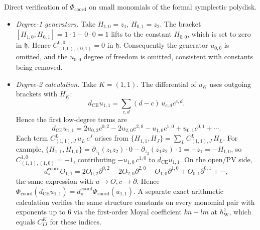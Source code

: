 \documentclass[11pt]{memoir}
\begin{document}
\begin{ex}\label{ex:low-degree-phi}
  Direct verification of \(\Phi_{\mathrm{coord}}\) on small monomials of
  the formal symplectic polydisk.

  \begin{itemize}
    \item \emph{Degree-1 generators.} Take $H_{1,0}=z_1$,
      $H_{0,1}=z_2$. The bracket
      $[H_{1,0},H_{0,1}]=1\cdot 1-0\cdot 0=1$ lifts to the constant
      $H_{0,0}$, which is set to zero in $\mathfrak h$. Hence
      $C^{0,0}_{(1,0),(0,1)}=0$ in $\mathfrak h$. Consequently
      the generator \(u_{0,0}\) is omitted, and the
      $u_{0,0}$ degree of freedom is omitted, consistent with
      constants being removed.

    \item \emph{Degree-2 calculation.} Take \(K=(1,1)\).  The
      differential of \(u_K\) uses outgoing brackets with \(H_K\):
      \[
        d_{\mathrm{CE}}u_{1,1}
        =\sum_{c,d}(d-c)\,u_{c,d}c^{c,d}.
      \]
      Hence the first low-degree terms are
      \[
        d_{\mathrm{CE}}u_{1,1}
        =
        2u_{0,2}c^{0,2}-2u_{2,0}c^{2,0}
        -u_{1,0}c^{1,0}+u_{0,1}c^{0,1}+\cdots .
      \]
      Each term
      \(C^L_{(1,1),J}\,u_L\,c^J\) arises from
      $\{H_{1,1},H_J\}=\sum_L C^L_{(1,1),J}\,H_L$. For example,
      $\{H_{1,1},H_{1,0}\}=\partial_{z_1}(z_1z_2)\cdot 0-
      \partial_{z_2}(z_1z_2)\cdot 1=-z_1=-H_{1,0}$, so
      $C^{1,0}_{(1,1),(1,0)}=-1$, contributing $-u_{1,0}\,c^{1,0}$ to
      $d_{\mathrm{CE}}u_{1,1}$. On the open/PV side,
      \[
        d_\pi^{\mathrm{coord}} O_{1,1}
        =
        2O_{0,2}\partial^{0,2}-2O_{2,0}\partial^{2,0}
        -O_{1,0}\partial^{1,0}+O_{0,1}\partial^{0,1}+\cdots ,
      \]
      the same expression with $u\to O,c\to\partial$. Hence
	      \(\Phi_{\mathrm{coord}}(d_{\mathrm{CE}}u_{1,1})
	      =d_\pi^{\mathrm{coord}}\Phi_{\mathrm{coord}}(u_{1,1})\). A separate
	      exact arithmetic calculation verifies the same structure constants
      on every monomial pair with exponents up to \(6\) via the
      first-order Moyal coefficient \(kn-lm\) at \(\hbar_{\mathrm{W}}^1\), which equals
      \(C^K_{IJ}\) for these indices.


\end{itemize}
\end{ex}
\end{document}

